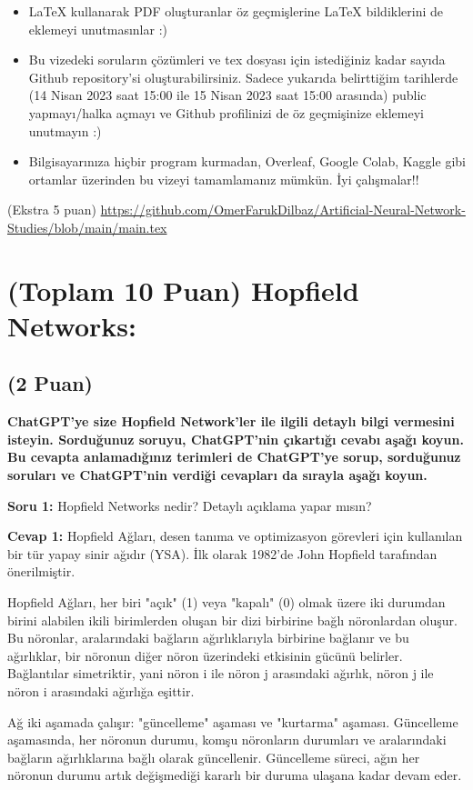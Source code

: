 \documentclass[11pt]{article}
\begin{document}
\begin{itemize}
    \item LaTeX kullanarak PDF oluşturanlar öz geçmişlerine LaTeX bildiklerini de eklemeyi unutmasınlar :)
    \item Bu vizedeki soruların çözümleri ve tex dosyası için istediğiniz kadar sayıda Github repository'si oluşturabilirsiniz. Sadece yukarıda belirttiğim tarihlerde (14 Nisan 2023 saat 15:00 ile 15 Nisan 2023 saat 15:00 arasında) public yapmayı/halka açmayı ve Github profilinizi de öz geçmişinize eklemeyi unutmayın :)
    \item Bilgisayarınıza hiçbir program kurmadan, Overleaf, Google Colab, Kaggle gibi ortamlar üzerinden bu vizeyi tamamlamanız mümkün. İyi çalışmalar!!
\end{itemize}
(Ekstra 5 puan) \url{https://github.com/OmerFarukDilbaz/Artificial-Neural-Network-Studies/blob/main/main.tex}


\section{(Toplam 10 Puan) Hopfield Networks:}

\subsection{(2 Puan)} \textbf{ChatGPT’ye size Hopfield Network’ler ile ilgili detaylı bilgi vermesini isteyin. Sorduğunuz soruyu, ChatGPT'nin çıkartığı cevabı aşağı koyun. Bu cevapta anlamadığınız terimleri de ChatGPT’ye sorup, sorduğunuz soruları ve ChatGPT’nin verdiği cevapları da sırayla aşağı koyun.}

\textbf{Soru 1:} Hopfield Networks nedir? Detaylı açıklama yapar mısın?

\textbf{Cevap 1:} Hopfield Ağları, desen tanıma ve optimizasyon görevleri için kullanılan bir tür yapay sinir ağıdır (YSA). İlk olarak 1982'de John Hopfield tarafından önerilmiştir.

Hopfield Ağları, her biri "açık" (1) veya "kapalı" (0) olmak üzere iki durumdan birini alabilen ikili birimlerden oluşan bir dizi birbirine bağlı nöronlardan oluşur. Bu nöronlar, aralarındaki bağların ağırlıklarıyla birbirine bağlanır ve bu ağırlıklar, bir nöronun diğer nöron üzerindeki etkisinin gücünü belirler. Bağlantılar simetriktir, yani nöron i ile nöron j arasındaki ağırlık, nöron j ile nöron i arasındaki ağırlığa eşittir.

Ağ iki aşamada çalışır: "güncelleme" aşaması ve "kurtarma" aşaması. Güncelleme aşamasında, her nöronun durumu, komşu nöronların durumları ve aralarındaki bağların ağırlıklarına bağlı olarak güncellenir. Güncelleme süreci, ağın her nöronun durumu artık değişmediği kararlı bir duruma ulaşana kadar devam eder.
\end{document}

